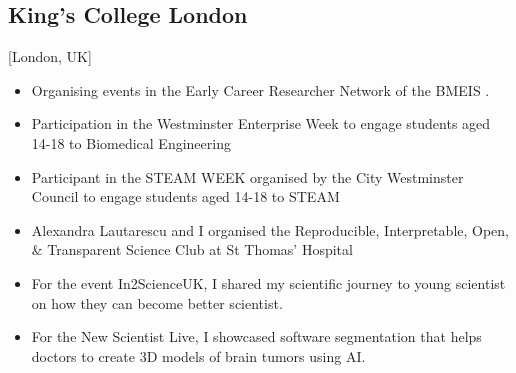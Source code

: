 \documentclass{mycv}
\begin{document}
\subsection{King's College London}[London, UK]
\begin{positions}
\end{positions}
\begin{itemize}
	\item Organising events in the Early Career Researcher Network of the BMEIS .
	\item Participation in the Westminster Enterprise Week to engage students aged 14-18 to Biomedical Engineering 
	\item Participant in the STEAM WEEK organised by the City Westminster Council to engage students aged 14-18 to STEAM \href{https://twitter.com/_mxochicale/status/1374407825607200769}{\faTwitter} 
	\item Alexandra Lautarescu and I organised the Reproducible, Interpretable, Open, \& Transparent Science Club at St Thomas' Hospital 
	\item For the event In2ScienceUK, I shared my scientific journey to young scientist on how they can become better scientist.  
	\item For the New Scientist Live, I showcased software segmentation that helps doctors to create 3D models of brain tumors using AI. 
\end{itemize}
\end{document}
